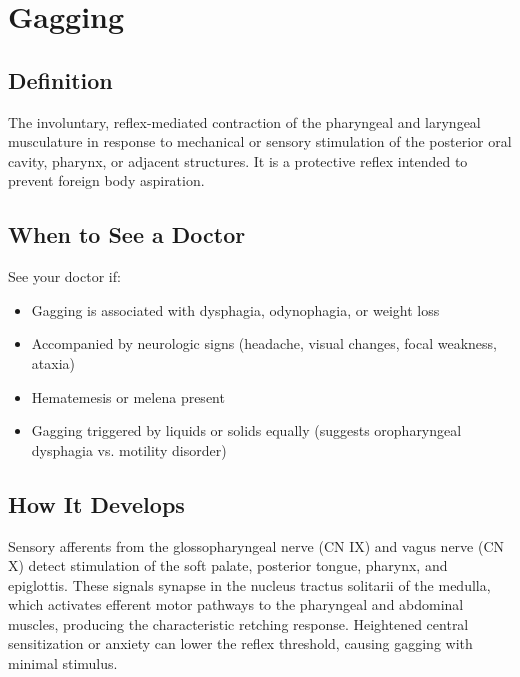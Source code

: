 \chapter{Gagging}

\section*{Definition}
The involuntary, reflex-mediated contraction of the pharyngeal and laryngeal musculature in response to mechanical or sensory stimulation of the posterior oral cavity, pharynx, or adjacent structures. It is a protective reflex intended to prevent foreign body aspiration.

\section*{When to See a Doctor}
See your doctor if:
\begin{itemize}
  \item Gagging is associated with dysphagia, odynophagia, or weight loss
  \item Accompanied by neurologic signs (headache, visual changes, focal weakness, ataxia)
  \item Hematemesis or melena present
  \item Gagging triggered by liquids or solids equally (suggests oropharyngeal dysphagia vs. motility disorder)
\end{itemize}

\section*{How It Develops}
Sensory afferents from the glossopharyngeal nerve (CN IX) and vagus nerve (CN X) detect stimulation of the soft palate, posterior tongue, pharynx, and epiglottis. These signals synapse in the nucleus tractus solitarii of the medulla, which activates efferent motor pathways to the pharyngeal and abdominal muscles, producing the characteristic retching response. Heightened central sensitization or anxiety can lower the reflex threshold, causing gagging with minimal stimulus.

